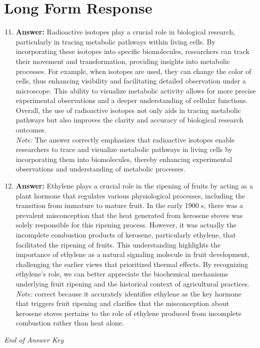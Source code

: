 \documentclass[12pt]{article}
\begin{document}
\section*{Long Form Response}
\begin{enumerate}[label=\arabic*.]
\setcounter{enumi}{10}
\item \textbf{Answer:} Radioactive isotopes play a crucial role in biological research, particularly in tracing metabolic pathways within living cells. By incorporating these isotopes into specific biomolecules, researchers can track their movement and transformation, providing insights into metabolic processes. For example, when isotopes are used, they can change the color of cells, thus enhancing visibility and facilitating detailed observation under a microscope. This ability to visualize metabolic activity allows for more precise experimental observations and a deeper understanding of cellular functions. Overall, the use of radioactive isotopes not only aids in tracing metabolic pathways but also improves the clarity and accuracy of biological research outcomes.
\\ \textit{Note:} The answer correctly emphasizes that radioactive isotopes enable researchers to trace and visualize metabolic pathways in living cells by incorporating them into biomolecules, thereby enhancing experimental observations and understanding of metabolic processes.
\item \textbf{Answer:} Ethylene plays a crucial role in the ripening of fruits by acting as a plant hormone that regulates various physiological processes, including the transition from immature to mature fruit. In the early 1900 s, there was a prevalent misconception that the heat generated from kerosene stoves was solely responsible for this ripening process. However, it was actually the incomplete combustion products of kerosene, particularly ethylene, that facilitated the ripening of fruits. This understanding highlights the importance of ethylene as a natural signaling molecule in fruit development, challenging the earlier views that prioritized thermal effects. By recognizing ethylene's role, we can better appreciate the biochemical mechanisms underlying fruit ripening and the historical context of agricultural practices.
\\ \textit{Note:} correct because it accurately identifies ethylene as the key hormone that triggers fruit ripening and clarifies that the misconception about kerosene stoves pertains to the role of ethylene produced from incomplete combustion rather than heat alone.
\end{enumerate}

\vfill
\noindent\textit{End of Answer Key}
\end{document}
